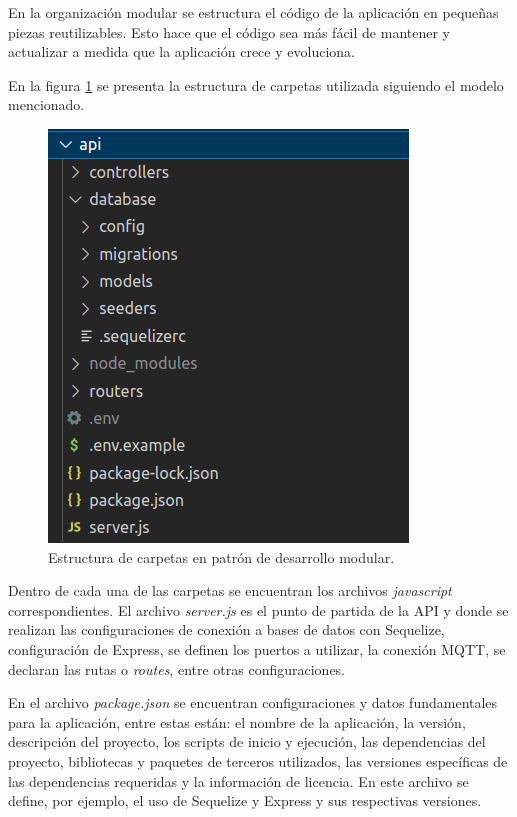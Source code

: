 En la organización modular se estructura el código de la aplicación en pequeñas piezas reutilizables. Esto hace que el código sea más fácil de mantener y actualizar a medida que la aplicación crece y evoluciona.

En la figura \ref{fig:apiestructura} se presenta la estructura de carpetas utilizada siguiendo el modelo mencionado. 

\begin{figure}[ht]
	\centering
	\includegraphics[scale=.50]{./Figures/api-estructura-archivos.png}
	\caption{Estructura de carpetas en patrón de desarrollo modular.}
	\label{fig:apiestructura}
\end{figure}

Dentro de cada una de las carpetas se encuentran los archivos \textit{javascript} correspondientes. El archivo \textit{server.js} es el punto de partida de la API y donde se realizan las configuraciones de conexión a bases de datos con Sequelize, configuración de Express, se definen los puertos a utilizar, la conexión MQTT, se declaran las rutas o \textit{routes}, entre otras configuraciones.

En el archivo \textit{package.json} se encuentran configuraciones y datos fundamentales para la aplicación, entre estas están: el nombre de la aplicación, la versión, descripción del proyecto, los scripts de inicio y ejecución, las dependencias del proyecto, bibliotecas y paquetes de terceros utilizados, las versiones específicas de las dependencias requeridas y la información de licencia. En este archivo se define, por ejemplo, el uso de Sequelize y Express y sus respectivas versiones.

